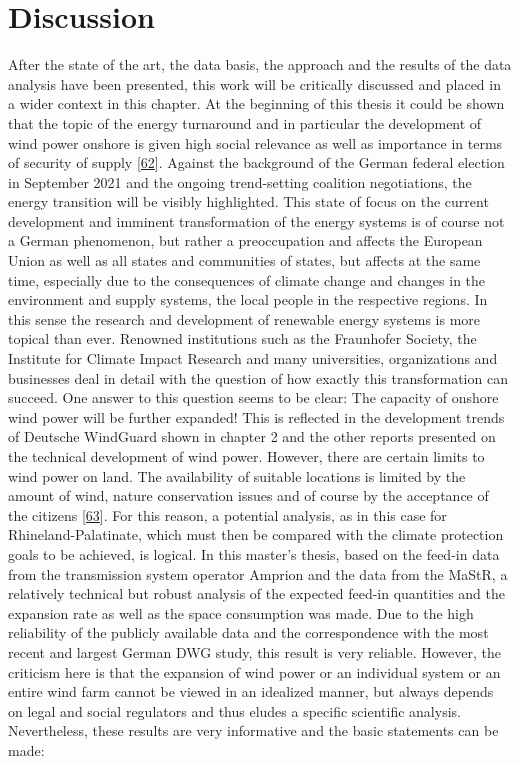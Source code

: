 \documentclass[a4paper,11pt]{article}
\begin{document}
\newpage

\hypertarget{discussion}{%
\section{Discussion}\label{discussion}}

After the state of the art, the data basis, the approach and the results of the data analysis have been presented, this work will be critically discussed and placed in a wider context in this chapter. At the beginning of this thesis it could be shown that the topic of the energy turnaround and in particular the development of wind power onshore is given high social relevance as well as importance in terms of security of supply {[}\protect\hyperlink{ref-ARD.2021}{62}{]}. Against the background of the German federal election in September 2021 and the ongoing trend-setting coalition negotiations, the energy transition will be visibly highlighted. This state of focus on the current development and imminent transformation of the energy systems is of course not a German phenomenon, but rather a preoccupation and affects the European Union as well as all states and communities of states, but affects at the same time, especially due to the consequences of climate change and changes in the environment and supply systems, the local people in the respective regions. In this sense the research and development of renewable energy systems is more topical than ever. Renowned institutions such as the Fraunhofer Society, the Institute for Climate Impact Research and many universities, organizations and businesses deal in detail with the question of how exactly this transformation can succeed. One answer to this question seems to be clear: The capacity of onshore wind power will be further expanded! This is reflected in the development trends of Deutsche WindGuard shown in chapter 2 and the other reports presented on the technical development of wind power. However, there are certain limits to wind power on land. The availability of suitable locations is limited by the amount of wind, nature conservation issues and of course by the acceptance of the citizens {[}\protect\hyperlink{ref-Stede.2019}{63}{]}. For this reason, a potential analysis, as in this case for Rhineland-Palatinate, which must then be compared with the climate protection goals to be achieved, is logical. In this master's thesis, based on the feed-in data from the transmission system operator Amprion and the data from the MaStR, a relatively technical but robust analysis of the expected feed-in quantities and the expansion rate as well as the space consumption was made. Due to the high reliability of the publicly available data and the correspondence with the most recent and largest German DWG study, this result is very reliable. However, the criticism here is that the expansion of wind power or an individual system or an entire wind farm cannot be viewed in an idealized manner, but always depends on legal and social regulators and thus eludes a specific scientific analysis. Nevertheless, these results are very informative and the basic statements can be made:
\end{document}
